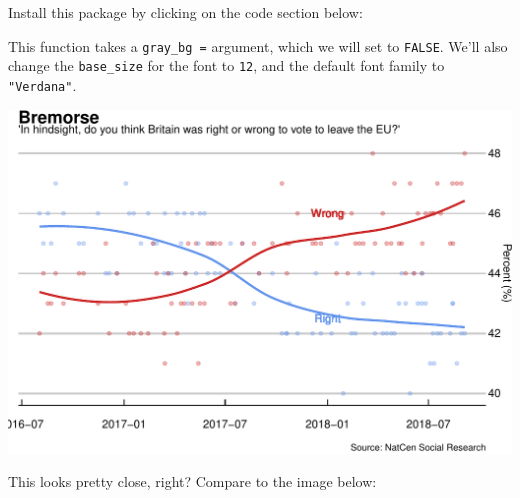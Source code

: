 \documentclass[letterpaper,12pt,twoside,]{pinp}
\begin{document}
Install this package by clicking on the code section below:

\begin{Shaded}
\begin{Highlighting}[]
\NormalTok{(}\NormalTok{)}
\end{Highlighting}
\end{Shaded}

This function takes a \texttt{gray\_bg\ =} argument, which we will set
to \texttt{FALSE}. We'll also change the \texttt{base\_size} for the
font to \texttt{12}, and the default font family to \texttt{"Verdana"}.

\begin{Shaded}
\begin{Highlighting}[]
\SpecialCharTok{+} 
\SpecialCharTok{::}\NormalTok{(} \NormalTok{, }
                                  \NormalTok{, }
                                  \NormalTok{)}
\end{Highlighting}
\end{Shaded}

\begin{center}\includegraphics{03-intro-to-ggplot2_files/figure-latex/theme_economist_white-1} \end{center}

This looks pretty close, right? Compare to the image below:
\end{document}
